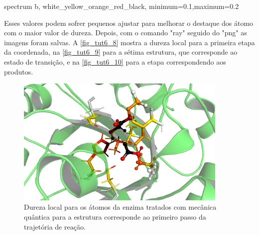 \documentclass[a4paper,11pt]{refart}
\begin{document}
\hspace*{-\leftmarginwidth}
\begin{minipage}{\fullwidth}\begin{pymol}spectrum b, white_yellow_orange_red_black, minimum=0.1,maximum=0.2
	\end{pymol}
\end{minipage}


Esses valores podem sofrer pequenos ajustar para melhorar o destaque dos átomo com o maior valor de dureza. Depois, com o comando "ray" seguido do "png" as imagens foram salvas. A \autoref{fig_tut6_8} mostra a dureza local para a primeira etapa da coordenada, na \autoref{fig_tut6_9} para a sétima estrutura, que corresponde ao estado de transição, e na \autoref{fig_tut6_10} para a etapa correspondendo aos produtos.


\hspace*{-\leftmarginwidth}
\begin{minipage}{\fullwidth}
	\begin{figure}[H]
		\begin{center}
			\includegraphics[width=4in]{images/tut6_img9}
			\caption{Dureza local para os átomos da enzima tratados com mecânica quântica para a estrutura corresponde ao primeiro passo da trajetória de reação. }
			\label{fig_tut6_8}
		\end{center}
	\end{figure}
\end{minipage}
\end{document}
